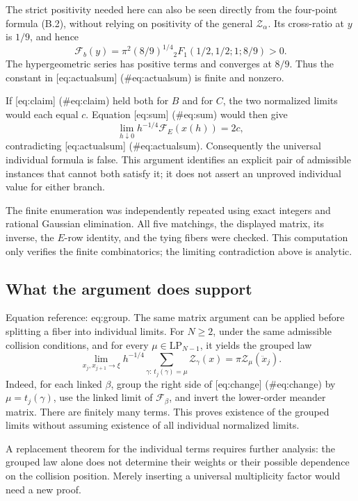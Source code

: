 \documentclass[10pt]{article}
\begin{document}
The strict positivity needed here can also be seen directly from the four-point formula (B.2), without relying on positivity of the general \(\mathcal Z_\alpha\). Its cross-ratio at \(y\) is \(1/9\), and hence \[\mathcal F_b(y)=\pi^2(8/9)^{1/4}
 {}_2F_1(1/2,1/2;1;8/9)>0.\] The hypergeometric series has positive terms and converges at \(8/9\). Thus the constant in [eq:actualsum] (\#eq:actualsum) is finite and nonzero.\par
If [eq:claim] (\#eq:claim) held both for \(B\) and for \(C\), the two normalized limits would each equal \(c\). Equation [eq:sum] (\#eq:sum) would then give \[\lim_{h\downarrow0}h^{-1/4}\mathcal F_E(x(h))=2c,\] contradicting [eq:actualsum] (\#eq:actualsum). Consequently the universal individual formula is false. This argument identifies an explicit pair of admissible instances that cannot both satisfy it; it does not assert an unproved individual value for either branch.\par
The finite enumeration was independently repeated using exact integers and rational Gaussian elimination. All five matchings, the displayed matrix, its inverse, the \(E\)-row identity, and the tying fibers were checked. This computation only verifies the finite combinatorics; the limiting contradiction above is analytic.\par
\subsection*{What the argument does support}
Equation reference: eq:group. The same matrix argument can be applied before splitting a fiber into individual limits. For \(N\ge2\), under the same admissible collision conditions, and for every \(\mu\in\mathrm{LP}_{N-1}\), it yields the grouped law \[
 \lim_{x_j,x_{j+1}\to\xi}
 h^{-1/4}\sum_{\gamma:\,t_j(\gamma)=\mu}\mathcal Z_\gamma(x)
   =\pi\mathcal Z_\mu(\ddot x_j).\] Indeed, for each linked \(\beta\), group the right side of [eq:change] (\#eq:change) by \(\mu=t_j(\gamma)\), use the linked limit of \(\mathcal F_\beta\), and invert the lower-order meander matrix. There are finitely many terms. This proves existence of the grouped limits without assuming existence of all individual normalized limits.\par
A replacement theorem for the individual terms requires further analysis: the grouped law alone does not determine their weights or their possible dependence on the collision position. Merely inserting a universal multiplicity factor would need a new proof.\par
\end{document}
